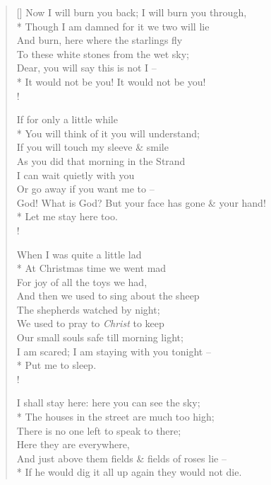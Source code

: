 \documentclass[MAIN]{subfiles}
\begin{document}
\begin{verse}[\versewidth]
Now I will burn you back; I will burn you through,\\*
\vin Though I am damned for it we two will lie\\
\vin And burn, here where the starlings fly\\
\vin To these white stones from the wet sky;\\
\vin Dear, you will say this is not I --\\*
It would not be you! It would not be you!\\!

If for only a little while\\*
\vin You will think of it you will understand;\\
\vin \vin If you will touch my sleeve \& smile\\
\vin As you did that morning in the {\sc Strand}\\
\vin \vin I can wait quietly with you\\
\vin \vin Or go away if you want me to --\\
God! What is God? But your face has gone \& your hand!\\*
\vin Let me stay here too.\\!

\vin \vin When I was quite a little lad\\*
\vin At Christmas time we went  mad\\
\vin \vin For joy of all the toys we had,\\
And then we used to sing about the sheep\\
\vin \vin The shepherds watched by night;\\
We used to pray to \emph{Christ} to keep\\
\vin \vin Our small souls safe till morning light;\\
I am scared; I am staying with you tonight --\\*
\vin \vin \vin \vin Put me to sleep.\\!

I shall stay here: here you can see the sky;\\*
The houses in the street are much too high;\\
\vin There is no one left to speak to there;\\
\vin Here they are everywhere,\\
And just above them fields \& fields of roses lie --\\*
If he would dig it all up again they would not die.
\end{verse}
\end{document}
